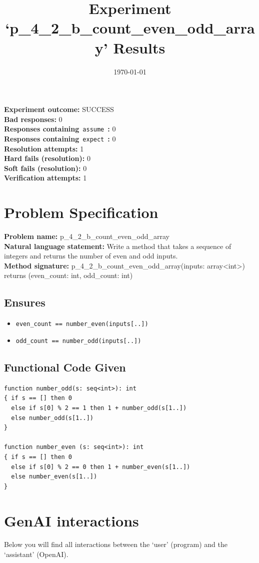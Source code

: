 \documentclass{article}
\begin{document}
\title{Experiment `p\_4\_2\_b\_count\_even\_odd\_array' Results}
\author{\today}
\date{}
\maketitle
\textbf{Experiment outcome: }SUCCESS
\\\textbf{Bad responses: }0
\\\textbf{Responses containing}~\texttt{assume}~\textbf{: }0
\\\textbf{Responses containing}~\texttt{expect}~\textbf{: }0
\\\textbf{Resolution attempts: }1
\\\textbf{Hard fails (resolution): }0
\\\textbf{Soft fails (resolution): }0
\\\textbf{Verification attempts: }1
\section*{Problem Specification}
\textbf{Problem name: }p\_4\_2\_b\_count\_even\_odd\_array
\\\textbf{Natural language statement: }Write a method that takes a sequence of integers and returns the number of even and odd inputs.
\\\textbf{Method signature: }p\_4\_2\_b\_count\_even\_odd\_array(inputs: array<int>) returns (even\_count: int, odd\_count: int)
\subsection*{Ensures}
\begin{itemize}
\item \texttt{even\_count == number\_even(inputs[..])}
\item \texttt{odd\_count == number\_odd(inputs[..])}
\end{itemize}
\subsection*{Functional Code Given}
\begin{lstlisting}
function number_odd(s: seq<int>): int
{ if s == [] then 0
  else if s[0] % 2 == 1 then 1 + number_odd(s[1..])
  else number_odd(s[1..])
}

function number_even (s: seq<int>): int
{ if s == [] then 0
  else if s[0] % 2 == 0 then 1 + number_even(s[1..])
  else number_even(s[1..])
}
\end{lstlisting}
\clearpage
\section*{GenAI interactions}
Below you will find all interactions between the `user' (program) and the `assistant' (OpenAI).
\end{document}
